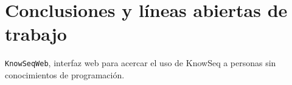 \chapter{Conclusiones y líneas abiertas de trabajo}

\texttt{KnowSeqWeb}, interfaz web para acercar el uso de KnowSeq a personas sin conocimientos de programación.

